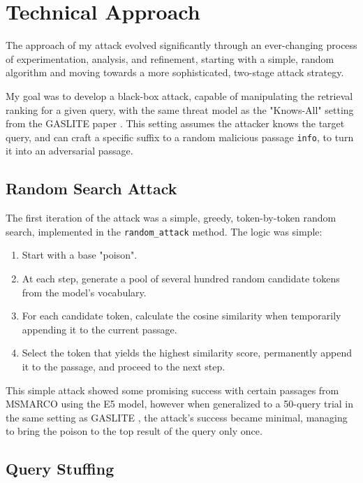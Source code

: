 \documentclass[a4paper, sigconf]{acmart}
\begin{document}
\section{Technical Approach}


The approach of my attack evolved significantly through an ever-changing process of experimentation, analysis, and refinement, starting with a simple, random algorithm and moving towards a more sophisticated, two-stage attack strategy. 

My goal was to develop a black-box attack, capable of manipulating the retrieval ranking for a given query, with the same threat model as the "Knows-All" setting from the GASLITE paper \cite{bentov2024}. This setting assumes the attacker knows the target query, and can craft a specific suffix to a random malicious passage \texttt{info}, to turn it into an adversarial passage. 


\subsection{Random Search Attack}

The first iteration of the attack was a simple, greedy, token-by-token random search, implemented in the \texttt{random\_attack} method. The logic was simple: 

\begin{enumerate}
  \item Start with a base "poison".
  \item At each step, generate a pool of several hundred random candidate tokens from the model's vocabulary. 
  \item For each candidate token, calculate the cosine similarity when temporarily appending it to the current passage.
  \item Select the token that yields the highest similarity score, permanently append it to the passage, and proceed to the next step.  
\end{enumerate}

This simple attack showed some promising success with certain passages from MSMARCO using the E5 model, however when generalized to a 50-query trial in the same setting as GASLITE \cite{bentov2024}, the attack's success became minimal, managing to bring the poison to the top result of the query only once.


\subsection{Query Stuffing}
\end{document}

